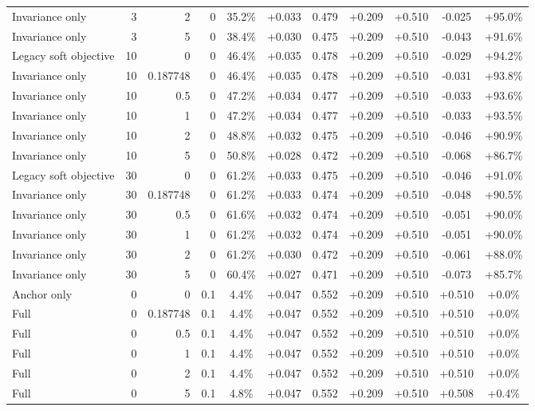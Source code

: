 \begin{table}[htbp]
\begin{tabular}{lrrrccccccc}
Invariance only & 3 & 2 & 0 & 35.2\% & +0.033 & 0.479 & +0.209 & +0.510 & -0.025 & +95.0\% \\
Invariance only & 3 & 5 & 0 & 38.4\% & +0.030 & 0.475 & +0.209 & +0.510 & -0.043 & +91.6\% \\
Legacy soft objective & 10 & 0 & 0 & 46.4\% & +0.035 & 0.478 & +0.209 & +0.510 & -0.029 & +94.2\% \\
Invariance only & 10 & 0.187748 & 0 & 46.4\% & +0.035 & 0.478 & +0.209 & +0.510 & -0.031 & +93.8\% \\
Invariance only & 10 & 0.5 & 0 & 47.2\% & +0.034 & 0.477 & +0.209 & +0.510 & -0.033 & +93.6\% \\
Invariance only & 10 & 1 & 0 & 47.2\% & +0.034 & 0.477 & +0.209 & +0.510 & -0.033 & +93.5\% \\
Invariance only & 10 & 2 & 0 & 48.8\% & +0.032 & 0.475 & +0.209 & +0.510 & -0.046 & +90.9\% \\
Invariance only & 10 & 5 & 0 & 50.8\% & +0.028 & 0.472 & +0.209 & +0.510 & -0.068 & +86.7\% \\
Legacy soft objective & 30 & 0 & 0 & 61.2\% & +0.033 & 0.475 & +0.209 & +0.510 & -0.046 & +91.0\% \\
Invariance only & 30 & 0.187748 & 0 & 61.2\% & +0.033 & 0.474 & +0.209 & +0.510 & -0.048 & +90.5\% \\
Invariance only & 30 & 0.5 & 0 & 61.6\% & +0.032 & 0.474 & +0.209 & +0.510 & -0.051 & +90.0\% \\
Invariance only & 30 & 1 & 0 & 61.2\% & +0.032 & 0.474 & +0.209 & +0.510 & -0.051 & +90.0\% \\
Invariance only & 30 & 2 & 0 & 61.2\% & +0.030 & 0.472 & +0.209 & +0.510 & -0.061 & +88.0\% \\
Invariance only & 30 & 5 & 0 & 60.4\% & +0.027 & 0.471 & +0.209 & +0.510 & -0.073 & +85.7\% \\
Anchor only & 0 & 0 & 0.1 & 4.4\% & +0.047 & 0.552 & +0.209 & +0.510 & +0.510 & +0.0\% \\
Full & 0 & 0.187748 & 0.1 & 4.4\% & +0.047 & 0.552 & +0.209 & +0.510 & +0.510 & +0.0\% \\
Full & 0 & 0.5 & 0.1 & 4.4\% & +0.047 & 0.552 & +0.209 & +0.510 & +0.510 & +0.0\% \\
Full & 0 & 1 & 0.1 & 4.4\% & +0.047 & 0.552 & +0.209 & +0.510 & +0.510 & +0.0\% \\
Full & 0 & 2 & 0.1 & 4.4\% & +0.047 & 0.552 & +0.209 & +0.510 & +0.510 & +0.0\% \\
Full & 0 & 5 & 0.1 & 4.8\% & +0.047 & 0.552 & +0.209 & +0.510 & +0.508 & +0.4\% \\

\end{tabular}
\end{table}
